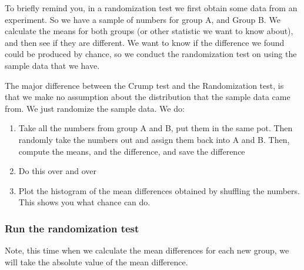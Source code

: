 \documentclass[]{book}
\providecommand{\tightlist}{%
  \setlength{\itemsep}{0pt}\setlength{\parskip}{0pt}}
\begin{document}
To briefly remind you, in a randomization test we first obtain some data
from an experiment. So we have a sample of numbers for group A, and
Group B. We calculate the means for both groups (or other statistic we
want to know about), and then see if they are different. We want to know
if the difference we found could be produced by chance, so we conduct
the randomization test on using the sample data that we have.

The major difference between the Crump test and the Randomization test,
is that we make no assumption about the distribution that the sample
data came from. We just randomize the sample data. We do:

\begin{enumerate}
\def\labelenumi{\arabic{enumi}.}
\tightlist
\item
  Take all the numbers from group A and B, put them in the same pot.
  Then randomly take the numbers out and assign them back into A and B.
  Then, compute the means, and the difference, and save the difference
\item
  Do this over and over
\item
  Plot the histogram of the mean differences obtained by shuffling the
  numbers. This shows you what chance can do.
\end{enumerate}

\subsubsection{Run the randomization
test}\label{run-the-randomization-test}

Note, this time when we calculate the mean differences for each new
group, we will take the absolute value of the mean difference.
\end{document}
